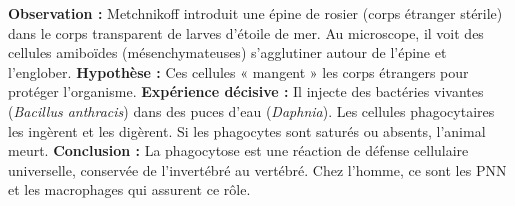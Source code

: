 \documentclass[11pt]{article}
\begin{document}
\begin{experience}
\textbf{Observation :} Metchnikoff introduit une épine de rosier (corps étranger stérile) dans le corps transparent de larves d'étoile de mer. Au microscope, il voit des cellules amiboïdes (mésenchymateuses) s'agglutiner autour de l'épine et l'englober.
\textbf{Hypothèse :} Ces cellules « mangent » les corps étrangers pour protéger l'organisme.
\textbf{Expérience décisive :} Il injecte des bactéries vivantes (\emph{Bacillus anthracis}) dans des puces d'eau (\emph{Daphnia}). Les cellules phagocytaires les ingèrent et les digèrent. Si les phagocytes sont saturés ou absents, l'animal meurt.
\textbf{Conclusion :} La phagocytose est une réaction de défense cellulaire universelle, conservée de l'invertébré au vertébré. Chez l'homme, ce sont les PNN et les macrophages qui assurent ce rôle.
\end{experience}
\end{document}
